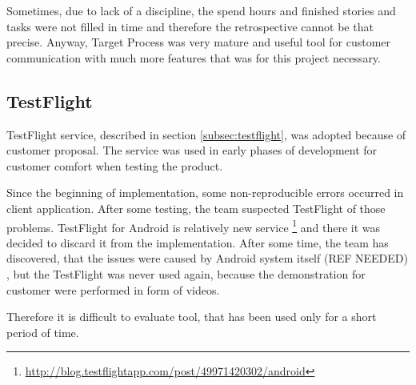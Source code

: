 Sometimes, due to lack of a discipline, the spend hours and finished stories and tasks were not filled in time and therefore the retrospective cannot be that precise.
Anyway, Target Process was very mature and useful tool for customer communication with much more features that was for this project necessary.


\subsection{TestFlight}
TestFlight service, described in section \ref{subsec:testflight}, was adopted because of customer proposal.
The service was used in early phases of development for customer comfort when testing the product.

Since the beginning of implementation, some non-reproducible errors occurred in client application.
After some testing, the team suspected TestFlight of those problems.
TestFlight for Android is relatively new service \footnote{\url{http://blog.testflightapp.com/post/49971420302/android}} and there it was decided to discard it from the implementation.
After some time, the team has discovered, that the issues were caused by Android system itself 
(REF NEEDED)
, but the TestFlight was never used again, because the demonstration for customer were performed in form of videos.
 
Therefore it is difficult to evaluate tool, that has been used only for a short period of time.

